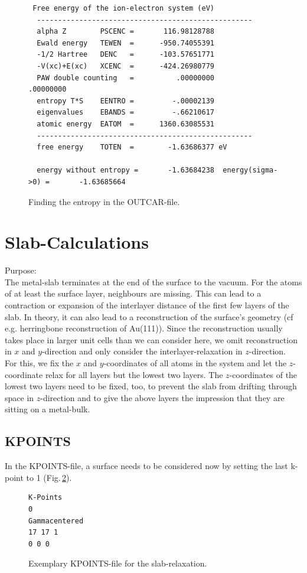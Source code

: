 \documentclass[twoside, 11pt, titlepage, captions=nooneline, a4paper, headsepline]{scrbook}%
\begin{document}
\begin{figure}[h!!]
\begin{verbatim}
 Free energy of the ion-electron system (eV)
  ---------------------------------------------------
  alpha Z        PSCENC =       116.98128788
  Ewald energy   TEWEN  =      -950.74055391
  -1/2 Hartree   DENC   =      -103.57651771
  -V(xc)+E(xc)   XCENC  =      -424.26980779
  PAW double counting   =          .00000000         .00000000
  entropy T*S    EENTRO =         -.00002139
  eigenvalues    EBANDS =         -.66210617
  atomic energy  EATOM  =      1360.63085531
  ---------------------------------------------------
  free energy    TOTEN  =        -1.63686377 eV

  energy without entropy =       -1.63684238  energy(sigma->0) =       -1.63685664  
\end{verbatim}
\caption{Finding the entropy in the OUTCAR-file.}
\label{ent1}
\end{figure}
\section{Slab-Calculations}
\label{slab}
Purpose:\\
The metal-slab terminates at the end of the surface to the vacuum. For the atoms of at least the surface layer, neighbours are missing. This can lead to a contraction or expansion of the interlayer distance of the first few layers of the slab. In theory, it can also lead to a reconstruction of the surface's geometry (cf e.g. herringbone reconstruction of Au(111)). Since the reconstruction usually takes place in larger unit cells than we can consider here, we omit reconstruction in $x$ and $y$-direction and only consider the interlayer-relaxation in $z$-direction.\\
For this, we fix the $x$ and $y$-coordinates of all atoms in the system and let the $z$-coordinate relax for all layers but the lowest two layers. The $z$-coordinates of the lowest two layers need to be fixed, too, to prevent the slab from drifting through space in $z$-direction and to give the above layers the impression that they are sitting on a metal-bulk.
\subsection{KPOINTS}
In the KPOINTS-file, a surface needs to be considered now by setting the last k-point to 1 (Fig.\,\ref{slabkp}).
\begin{figure}[h!!]
\begin{verbatim}
K-Points
0
Gammacentered
17 17 1
0 0 0
\end{verbatim}
\caption{Exemplary KPOINTS-file for the slab-relaxation.}
\label{slabkp}
\end{figure}
\end{document}
